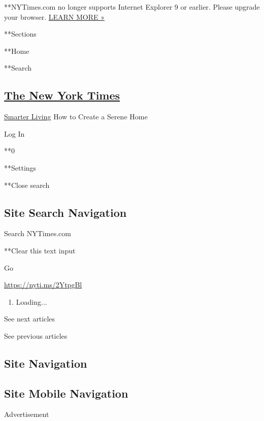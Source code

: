  **NYTimes.com no longer supports Internet Explorer 9 or earlier. Please
upgrade your browser.
\href{http://www.nytimes3xbfgragh.onion/content/help/site/ie9-support.html}{LEARN
MORE »}

**Sections

**Home

**Search

\hypertarget{the-new-york-times}{%
\subsection{\texorpdfstring{\href{http://www.nytimes3xbfgragh.onion/}{The
New York Times}}{The New York Times}}\label{the-new-york-times}}

 \href{/section/smarter-living}{Smarter Living} \textbar{}How to Create
a Serene Home

Log In

**0

**Settings

**Close search

\hypertarget{site-search-navigation}{%
\subsection{Site Search Navigation}\label{site-search-navigation}}

Search NYTimes.com

**Clear this text input

Go

\url{https://nyti.ms/2YtpgBl}

\begin{enumerate}
\def\labelenumi{\arabic{enumi}.}
\item
  Loading...
\end{enumerate}

See next articles

See previous articles

\hypertarget{site-navigation}{%
\subsection{Site Navigation}\label{site-navigation}}

\hypertarget{site-mobile-navigation}{%
\subsection{Site Mobile Navigation}\label{site-mobile-navigation}}

Advertisement

